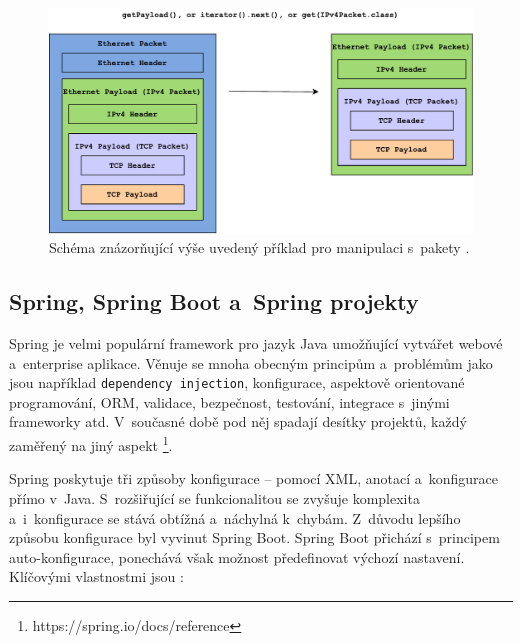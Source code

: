 \begin{figure}[!h]
  \centering
  \includegraphics[width=15cm]{template-fig/Pcap4JExample.pdf}
  \caption{Schéma znázorňující výše uvedený příklad pro manipulaci s~pakety \cite{gitPcap4J}.}
  \label{FIG_Pcap4JExample}
\end{figure}

\subsection{Spring, Spring Boot a~Spring projekty} \label{springProjects}
Spring je velmi populární framework pro jazyk Java umožňující vytvářet webové a~enterprise aplikace. Věnuje se mnoha obecným principům a~problémům jako jsou například \texttt{dependency injection}, konfigurace, aspektově orientované programování, ORM, validace, bezpečnost, testování, integrace s~jinými frameworky atd. V~současné době pod něj spadají desítky projektů, každý zaměřený na jiný aspekt \footnote{https://spring.io/docs/reference}.

Spring poskytuje tři způsoby konfigurace -- pomocí XML, anotací a~konfigurace přímo v~Java. S~rozšiřující se funkcionalitou se zvyšuje komplexita a~i~konfigurace se stává obtížná a~náchylná k~chybám. Z~důvodu lepšího způsobu konfigurace byl vyvinut Spring Boot. Spring Boot přichází s~principem auto-konfigurace, ponechává však možnost předefinovat výchozí nastavení. Klíčovými vlastnostmi jsou \cite{whySpringBoot}:

